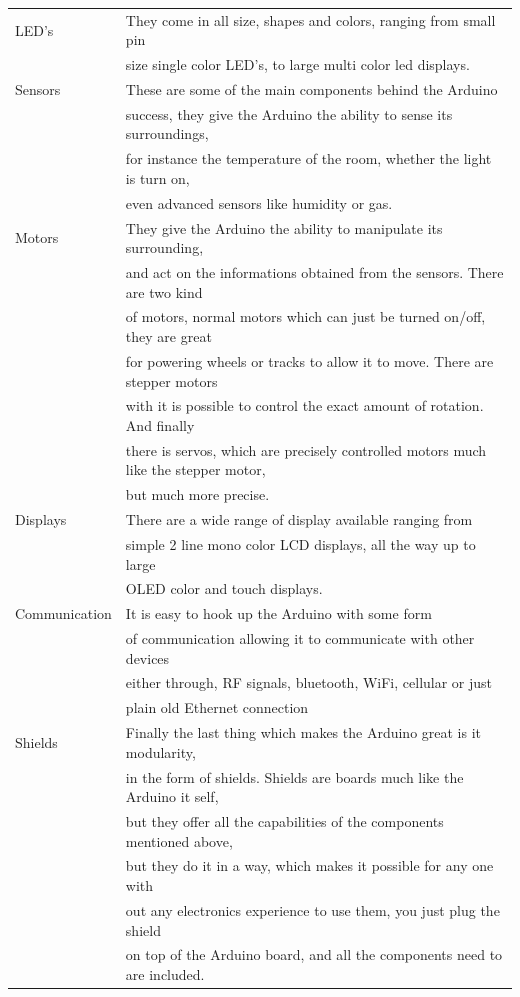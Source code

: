 \begin{tabular}{|l|l|}
\hline 
LED's & They come in all size, shapes and colors, ranging from small pin \\
& size single color LED's, to large multi color led displays.\\ 
\hline 
Sensors & These are some of the main components behind the Arduino\\
& success, they give the Arduino the ability to sense its surroundings,\\
& for instance the temperature of the room, whether the light is turn on,\\
& even advanced sensors like humidity or gas.  \\ 
\hline 
Motors & They give the Arduino the ability to manipulate its surrounding,\\
& and act on the informations obtained from the sensors. There are two kind \\
& of motors, normal motors which can just be turned on/off, they are great \\
& for powering wheels or tracks to allow it to move. There are stepper motors \\
& with it is possible to control the exact amount of rotation. And finally \\
& there is servos, which are precisely controlled motors much like the stepper motor,\\
&  but much more precise.  \\
\hline 
Displays & There are a wide range of display available ranging from\\ 
& simple 2 line mono color LCD displays, all the way up to large\\
& OLED color and touch displays.   \\ 
\hline 
Communication & It is easy to hook up the Arduino with some form\\ & of communication allowing it to communicate with other devices\\
& either through, RF signals, bluetooth, WiFi, cellular or just\\
& plain old Ethernet connection \\ 
\hline 
Shields & Finally the last thing which makes the Arduino great is it modularity,\\
& in the form of shields. Shields are boards much like the Arduino it self,\\
& but they offer all the capabilities of the components mentioned above, \\
& but they do it in a way, which makes it possible for any one with \\
& out any electronics experience to use them, you just plug the shield \\
& on top of the Arduino board, and all the components need to are included. \\
\hline
\end{tabular} 

